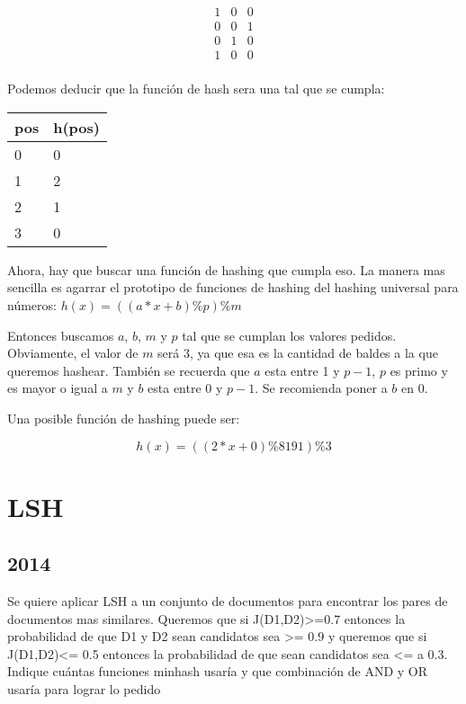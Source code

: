 \documentclass[a4paper]{article}
\newenvironment{enunciado}[3]{%
    \vspace{\baselineskip}
    \tcolorbox[beamer,%
    noparskip,breakable,
    colback=LightGreen,colframe=DarkGreen,%
    colbacklower=LimeGreen!75!LightGreen,%
    title=\small Enunciado: Año #1\, Cuatrimestre #2\, Oportunidad #3]}%
    {\endtcolorbox}
\begin{document}
    \[ 
    \begin{matrix}
        1 & 0 & 0 \\
        0 & 0 & 1 \\
        0 & 1 & 0 \\
        1 & 0 & 0 \\
    \end{matrix}
    \]

    Podemos deducir que la función de hash sera una tal que se cumpla:

    \begin{table}[H]
        \begin{tabular}{|l|l|}
        \hline
        pos & h(pos) \\
        \hline
        0   & 0      \\
        1   & 2      \\
        2   & 1      \\
        3   & 0      \\
        \hline
        \end{tabular}
    \end{table}

    Ahora, hay que buscar una función de hashing que cumpla eso. La manera mas sencilla es agarrar el prototipo de funciones de hashing del hashing universal para números: $h(x) = ((a * x + b) \% p) \% m$

    Entonces buscamos $a$, $b$, $m$ y $p$ tal que se cumplan los valores pedidos. Obviamente, el valor de $m$ será 3, ya que esa es la cantidad de baldes a la que queremos hashear. También se recuerda que $a$ esta entre 1 y $p-1$, $p$ es primo y es mayor o igual a $m$ y $b$ esta entre 0 y $p-1$. Se recomienda poner a $b$ en 0.

    Una posible función de hashing puede ser:

    $$ h(x) = ((2*x + 0) \% 8191) \% 3 $$

    \section{LSH}

    \subsection{2014}
    
    \begin{enunciado}{2014}{1}{1}
        Se quiere aplicar LSH a un conjunto de documentos para encontrar los pares de documentos mas similares. Queremos que si J(D1,D2)>=0.7 entonces la probabilidad de que D1 y D2 sean candidatos sea >= 0.9 y queremos que si J(D1,D2)<= 0.5 entonces la probabilidad de que sean candidatos sea <= a 0.3. Indique cuántas funciones minhash usaría y que combinación de AND y OR usaría para lograr lo pedido
    \end{enunciado}
\end{document}
